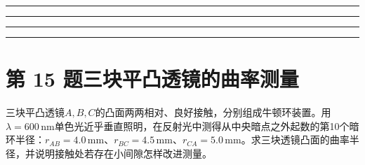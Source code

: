 \documentclass[UTF8,fontset=fandol,a4paper,11pt]{ctexart}
\newcommand{\workarea}{\par\vspace{7mm}\noindent{\small\color{muted}作答区}\par\vspace{4mm}
\noindent\textcolor{rulegray}{\rule{\linewidth}{0.3pt}}\par\vspace{16mm}
\noindent\textcolor{rulegray}{\rule{\linewidth}{0.3pt}}\par\vspace{16mm}
\noindent\textcolor{rulegray}{\rule{\linewidth}{0.3pt}}\par\vspace{16mm}
\noindent\textcolor{rulegray}{\rule{\linewidth}{0.3pt}}}
\begin{document}
\workarea

\clearpage


\section*{第 15 题\quad 三块平凸透镜的曲率测量}\label{q:15}

三块平凸透镜$A,B,C$的凸面两两相对、良好接触，分别组成牛顿环装置。用$\lambda=600\,\mathrm{nm}$单色光近乎垂直照明，在反射光中测得从中央暗点之外起数的第10个暗环半径：$r_{AB}=4.0\,\mathrm{mm}$、$r_{BC}=4.5\,\mathrm{mm}$、$r_{CA}=5.0\,\mathrm{mm}$。求三块透镜凸面的曲率半径，并说明接触处若存在小间隙怎样改进测量。

\begin{center}\begin{minipage}{.98\linewidth}\centering
\begin{tikzpicture}[x=.65cm,y=.48cm]

\end{tikzpicture}
\end{minipage}
\end{center}
\end{document}
